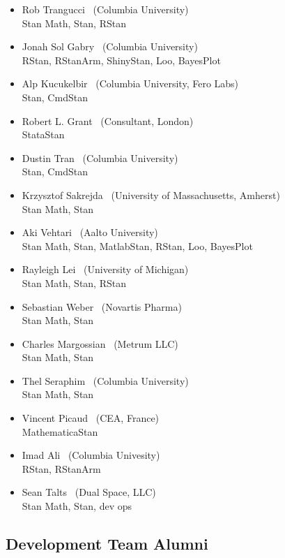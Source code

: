 \begin{itemize}
\\ {\footnotesize MatlabStan}
\item Rob Trangucci \   (Columbia University)
\\ {\footnotesize Stan Math, Stan, RStan}
\item Jonah Sol Gabry \ (Columbia University)
\\ {\footnotesize RStan, RStanArm, ShinyStan, Loo, BayesPlot}
\item Alp Kucukelbir \ (Columbia University, Fero Labs)
\\ {\footnotesize Stan, CmdStan}
\item Robert L. Grant \ (Consultant, London)
\\ {\footnotesize StataStan}
\item Dustin Tran \ (Columbia University)
\\ {\footnotesize Stan, CmdStan}
\item Krzysztof Sakrejda \ (University of Massachusetts, Amherst)
\\ {\footnotesize Stan Math, Stan}
\item Aki Vehtari \ (Aalto University) \\ {\footnotesize Stan Math,
    Stan, MatlabStan, RStan, Loo, BayesPlot}
\item Rayleigh Lei \ (University of Michigan)
\\ {\footnotesize Stan Math, Stan, RStan}
\item Sebastian Weber \ (Novartis Pharma)
\\ {\footnotesize Stan Math, Stan}
\item Charles Margossian \ (Metrum LLC)
\\ {\footnotesize Stan Math, Stan}
\item Thel Seraphim \ (Columbia University)
\\ {\footnotesize Stan Math, Stan}
\item Vincent Picaud \ (CEA, France)
\\ {\footnotesize MathematicaStan}
\item Imad Ali \ (Columbia Univesity)
\\ {\footnotesize RStan, RStanArm}
\item Sean Talts \ (Dual Space, LLC)
\\ {\footnotesize Stan Math, Stan, dev ops}
\end{itemize}

\subsection*{Development Team Alumni}

